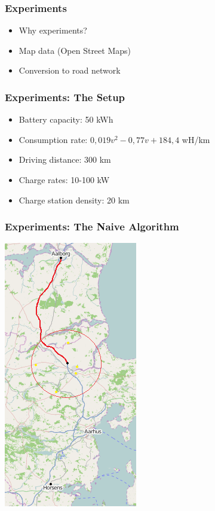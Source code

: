 \begin{frame}
  \frametitle{Experiments}
  \begin{itemize}
  	\item Why experiments?
  	\item Map data (Open Street Maps)
  	\item Conversion to road network
  \end{itemize}
\end{frame}

\begin{frame}
  \frametitle{Experiments: The Setup} 
  \begin{itemize}
  	\item Battery capacity: 50 kWh
  	\item Consumption rate: $0,019v^2 - 0,77v + 184,4$ wH/km
  	\item Driving distance: 300 km
  	\item Charge rates: 10-100 kW
  	\item Charge station density: 20 km
  \end{itemize}
\end{frame}

\begin{frame}
  \frametitle{Experiments: The Naive Algorithm}
  \begin{center}
	  \includegraphics[scale=0.6]{images/AalborgtoHorsens1}  
  \end{center}
\end{frame}

